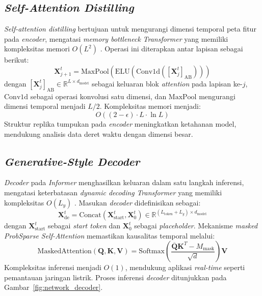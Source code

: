 \subsection{\textit{Self-Attention Distilling}}

\textit{Self-attention distilling} bertujuan untuk mengurangi dimensi temporal peta fitur pada \textit{encoder}, mengatasi \textit{memory bottleneck} \textit{Transformer} yang memiliki kompleksitas memori \( O(L^2) \) \citep{Zhou2021}. Operasi ini diterapkan antar lapisan sebagai berikut:
\begin{equation}
\mathbf{X}_{j+1}^t = \text{MaxPool}\left( \text{ELU}\left( \text{Conv1d}\left( [\mathbf{X}_j^t]_{\text{AB}} \right) \right) \right) \label{eq:bab2_eq46}
\end{equation}
dengan \( [\mathbf{X}_j^t]_{\text{AB}} \in \mathbb{R}^{L \times d_{\text{model}}} \) sebagai keluaran blok \textit{attention} pada lapisan ke-\( j \), \( \text{Conv1d} \) sebagai operasi konvolusi satu dimensi, dan \( \text{MaxPool} \) mengurangi dimensi temporal menjadi \( L/2 \). Kompleksitas memori menjadi:
\begin{equation}
O((2-\epsilon) \cdot L \cdot \ln L) \label{eq:bab2_eq47}
\end{equation}
Struktur replika tumpukan pada \textit{encoder} meningkatkan ketahanan model, mendukung analisis data deret waktu dengan dimensi besar.

\subsection{\textit{Generative-Style Decoder}}

\textit{Decoder} pada \textit{Informer} menghasilkan keluaran dalam satu langkah inferensi, mengatasi keterbatasan \textit{dynamic decoding} \textit{Transformer} yang memiliki kompleksitas \( O(L_y) \) \citep{Zhou2021}. Masukan \textit{decoder} didefinisikan sebagai:
\begin{equation}
\mathbf{X}_{\text{de}}^t = \text{Concat}\left( \mathbf{X}_{\text{start}}^t, \mathbf{X}_0^t \right) \in \mathbb{R}^{(L_{\text{token}} + L_y) \times d_{\text{model}}} \label{eq:bab2_eq48}
\end{equation}
dengan \( \mathbf{X}_{\text{start}}^t \) sebagai \textit{start token} dan \( \mathbf{X}_0^t \) sebagai \textit{placeholder}. Mekanisme \textit{masked ProbSparse Self-Attention} memastikan kausalitas temporal melalui:
\begin{equation}
\text{MaskedAttention}(\mathbf{Q}, \mathbf{K}, \mathbf{V}) = \text{Softmax}\left( \frac{\overline{\mathbf{Q}} \mathbf{K}^T - M_{\text{mask}}}{\sqrt{d}} \right) \mathbf{V} \label{eq:bab2_eq49}
\end{equation}
Kompleksitas inferensi menjadi \( O(1) \), mendukung aplikasi \textit{real-time} seperti pemantauan jaringan listrik. Proses inferensi \textit{decoder} ditunjukkan pada Gambar~\ref{fig:network_decoder}.

